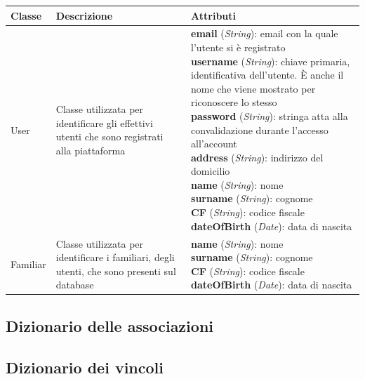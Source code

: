 \begin{table}[!h]

    \centering

    \begin{tabular}{m{2cm}|m{4cm}|m{7.7cm}}

         \rowcolor{black!10}Classe & Descrizione & Attributi\\ \hline

         User & Classe utilizzata per identificare gli effettivi utenti che sono registrati alla piattaforma &
         \parbox{7.7cm}{\textbf{email} (\textit{String}): email con la quale l'utente si è registrato \\ 
         \textbf{username} (\textit{String}): chiave primaria, identificativa dell'utente. È anche il nome che viene mostrato per riconoscere lo stesso \\
         \textbf{password} (\textit{String}): stringa atta alla convalidazione durante l'accesso all'account \\
         \textbf{address} (\textit{String}): indirizzo del domicilio \\
         \textbf{name} (\textit{String}): nome \\
         \textbf{surname} (\textit{String}): cognome \\
         \textbf{CF} (\textit{String}): codice fiscale \\
         \textbf{dateOfBirth} (\textit{Date}): data di nascita} \\ \hline

         Familiar & Classe utilizzata per identificare i familiari, degli utenti, che sono presenti sul database &
         \parbox{7.7cm}{\textbf{name} (\textit{String}): nome \\
         \textbf{surname} (\textit{String}): cognome \\
         \textbf{CF} (\textit{String}): codice fiscale \\
         \textbf{dateOfBirth} (\textit{Date}): data di nascita} \\ \hline
    
        \end{tabular}

\end{table}

\subsection{Dizionario delle associazioni}

\subsection{Dizionario dei vincoli}